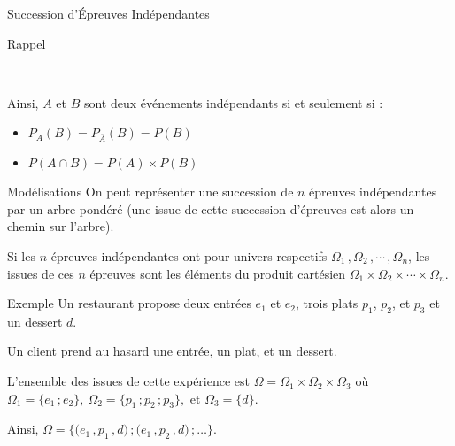 \documentclass{cours}
\begin{document}
\begin{Gpartie}{Succession d'Épreuves Indépendantes}
\begin{Spartie}{Rappel}
\begin{center}
                \parbox{\linewidth}{} \\[2ex]
            \end{center}
            Ainsi, $A$ et $B$ sont deux événements indépendants si et seulement si :
            \begin{itemize}
                \item $P_A(B)=P_{\overline{A}}(B)=P(B)$
                \item $P(A\cap B)=P(A)\times P(B)$
            \end{itemize}
        \end{Spartie}
        \pagebreak
        \begin{Spartie}{Modélisations} 
            On peut représenter une succession de $n$ épreuves indépendantes par un arbre pondéré (une issue de cette succession d'épreuves est alors un chemin sur l'arbre).

            Si les $n$ épreuves indépendantes ont pour univers respectifs $\Omega_1\,,\Omega_2\,,\dotsb\,,\Omega_n$, les issues de ces $n$ épreuves sont les éléments du produit cartésien $\Omega_1\times\Omega_2\times\dotsb\times\Omega_n$.
        \end{Spartie}
        \begin{Spartie}{Exemple} 
            Un restaurant propose deux entrées $e_1$ et $e_2$, trois plats $p_1$, $p_2$, et $p_3$ et un dessert $d$.

            Un client prend au hasard une entrée, un plat, et un dessert.

            L'ensemble des issues de cette expérience est $\Omega=\Omega_1\times\Omega_2\times\Omega_3$ où $\Omega_1=\big\{e_1\,; e_2\big\},\ \Omega_2=\big\{p_1\,; p_2\,; p_3\big\},\text{ et }\Omega_3=\big\{d\big\}$.

            Ainsi, $\Omega=\bigg\{\big(e_1\,, p_1\,, d\big)\,;\big(e_1\,, p_2\,, d\big)\,;\dotsc\bigg\}$.


\end{Spartie}
\end{Gpartie}
\end{document}
